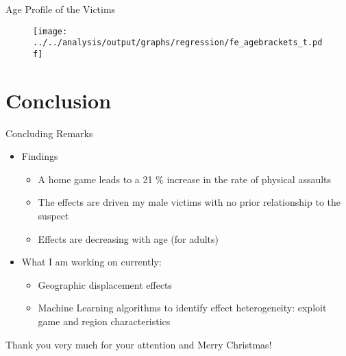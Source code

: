 \documentclass[usenames,dvipsnames]{beamer} %
\begin{document}
	\begin{frame}{Age Profile of the Victims}\label{link_regression_age_profile}
		\begin{figure}[H]\centering
			\texttt{[image: ../../analysis/output/graphs/regression/fe\_agebrackets\_t.pdf]}
		\end{figure}
		\hyperlink{link_regression_age_profile_per_gender}{}
	\end{frame}




\section{Conclusion}

\begin{frame}{Concluding Remarks}
	\begin{itemize}
		\item Findings
		\begin{itemize}
			\item A home game leads to a 21 \% increase in the rate of physical assaults
			\item The effects are driven my male victims with no prior relationship to the suspect
			\item Effects are decreasing with age (for adults)
		\end{itemize}				
		\item What I am working on currently: 
		\begin{itemize}
			\item Geographic displacement effects
			\item Machine Learning algorithms to identify effect heterogeneity: exploit game and region characteristics
		\end{itemize}
	\end{itemize}
\end{frame}


\begin{frame}
	\begin{center}
		Thank you very much for your attention \newline and Merry Christmas!
	\end{center}
\end{frame}
\end{document}
